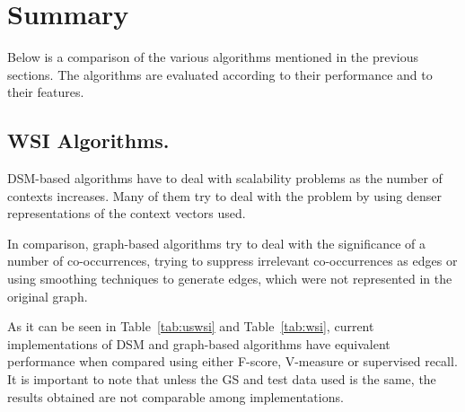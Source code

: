 \section{Summary}

Below is a comparison of the various algorithms mentioned in the previous
sections. The algorithms are evaluated according to their performance and to
their features.

\subsection{WSI Algorithms.}

\ac{DSM}-based algorithms have to deal with scalability problems as the number
of contexts increases. Many of them try to deal with the problem by using denser
representations of the context vectors used.

In comparison, graph-based algorithms try to deal with the significance of a
number of co-occurrences, trying to suppress irrelevant co-occurrences as edges
or using smoothing techniques to generate edges, which were not represented in
the original graph.

As it can be seen in Table~\ref{tab:uswsi} and Table~\ref{tab:wsi}, current
implementations of \ac{DSM} and graph-based algorithms have equivalent
performance when compared using either F-score, V-measure or supervised recall.
It is important to note that unless the \ac{GS} and test data used is the same,
the results obtained are not comparable among implementations.


